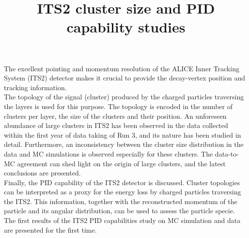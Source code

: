 \documentclass[11pt]{article}
\title{\LARGE\textbf{{ITS2 cluster size and PID capability studies}}}
\author{ }
\date{ }
\begin{document}
\maketitle

The excellent pointing and momentum resolution of the ALICE Inner Tracking System (ITS2) detector makes it crucial to provide the decay-vertex position and tracking information.\\

The topology of the signal (cluster) produced by the charged particles traversing the layers is used for this purpose. The topology is encoded in the number of clusters per layer, the size of the clusters and their position.
An unforeseen abundance of large clusters in ITS2 has been observed in the data collected within the first year of data taking of Run 3, and its nature has been studied in detail. Furthermore, an inconsistency between the cluster size distribution in the data and MC simulations is observed especially for these clusters. The data-to-MC agreement can shed light on the origin of large clusters, and the latest conclusions are presented.\\

Finally, the PID capability of the ITS2 detector is discussed. Cluster topologies can be interpreted as a proxy for the energy loss by charged particles traversing the ITS2. This information, together with the reconstructed momentum of the particle and its angular distribution, can be used to assess the particle specie. The first results of the ITS2 PID capabilities study on MC simulation and data are presented for the first time.
\end{document}
